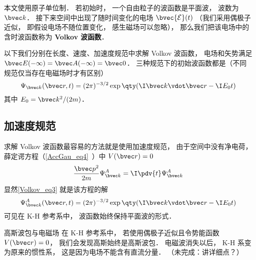 
\begin{issues}
\issueTODO
\end{issues}


本文使用原子单位制． 若初始时， 一个自由粒子的波函数是平面波， 波数为 $\bvec k$． 接下来空间中出现了随时间变化的电场 $\bvec {\mathcal E}(t)$ （我们采用偶极子近似， 即假设电场不随位置变化， 感生磁场可以忽略）， 那么我们把该电场中的含时波函数称为 \textbf{Volkov 波函数}．

以下我们分别在长度、速度、加速度规范中求解 Volkov 波函数， 电场和矢势满足 $\bvec E(-\infty) = \bvec A(-\infty) = \bvec 0$． 三种规范下的初始波函数都是（不同规范仅当存在电磁场时才有区别）
\begin{equation}\label{Volkov_eq3}
\Psi_{\bvec k}(\bvec r, t) = (2\pi)^{-3/2} \exp\qty(\I\bvec k \vdot \bvec r - \I E_0 t)
\end{equation}
其中 $E_0 = \bvec k^2/(2m)$．

\subsection{加速度规范}
求解 Volkov 波函数最容易的方法就是使用加速度规范， 由于空间中没有净电荷， 薛定谔方程（\autoref{AccGau_eq4}~）中 $V(\bvec r) = 0$
\begin{equation}
\frac{\bvec p^2}{2m}\Psi_{\bvec k}^A = \I \pdv{t} \Psi_{\bvec k}^A
\end{equation}
显然\autoref{Volkov_eq3} 就是该方程的解
\begin{equation}\label{Volkov_eq2}
\Psi_{\bvec k}^A(\bvec r, t) = (2\pi)^{-3/2} \exp\qty(\I\bvec k \vdot \bvec r - \I E_0 t)
\end{equation}
可见在 K-H 参考系中， 波函数始终保持平面波的形式．

\begin{example}{高斯波包与电磁场}
在 K-H 参考系中， 若使用偶极子近似且令势能函数 $V(\bvec r) = 0$， 我们会发现高斯始终是高斯波包． 电磁波消失以后， K-H 系变为原来的惯性系， 这是因为电场不能含有直流分量． （未完成：讲详细点？）
\end{example}


